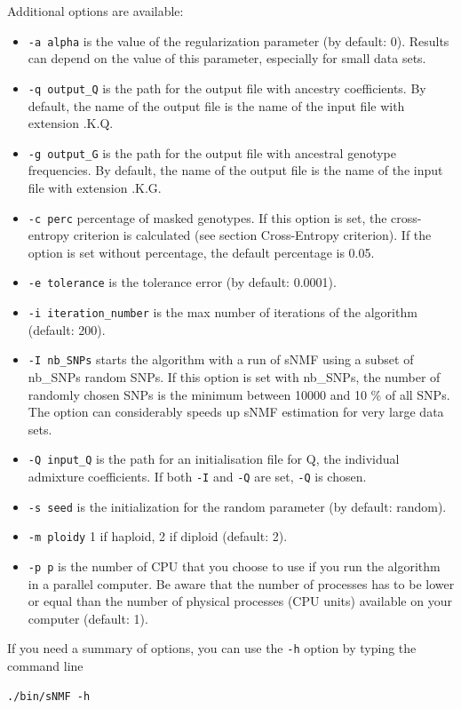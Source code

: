 \documentclass[10pt,a4paper]{article}
\begin{document}
\noindent
Additional options are available:
\begin{itemize}
\item \verb|-a alpha| is the value of the regularization parameter (by default: 0). Results can depend on the value of this parameter, especially for small data sets. 
\item \verb|-q output_Q| is the path for the output file with ancestry coefficients. By default, the name of the output file is the name of the input file with extension .K.Q.
\item \verb|-g output_G| is the path for the output file with ancestral genotype frequencies. By default, the name of the output file is the name of the input file with extension .K.G.
\item \verb|-c perc| percentage of masked genotypes. If this option is set, the cross-entropy criterion is calculated (see section Cross-Entropy criterion). If the option is set without percentage, the default percentage is 0.05.
\item \verb|-e tolerance| is the tolerance error (by default: 0.0001). 
\item \verb|-i iteration_number| is the max number of iterations of the algorithm (default: 200). 
\item \verb|-I nb_SNPs| starts the algorithm with a run of sNMF using a subset of nb\_SNPs random SNPs. If this option is set with nb\_SNPs, the number of randomly chosen SNPs is the minimum between 10000 and 10 \% of all SNPs. The option can considerably speeds up sNMF estimation for very large data sets.
\item \verb|-Q input_Q| is the path for an initialisation file for Q, the individual admixture coefficients. If both \verb|-I| and \verb|-Q| are set, \verb|-Q| is chosen.
\item \verb|-s seed| is the initialization for the random parameter (by default: random). 
\item \verb|-m ploidy|  1 if haploid, 2 if diploid (default: 2). 
\item \verb|-p p| is the number of CPU that you choose to use if you run the algorithm in 
a parallel computer. Be aware that the number of processes has to be lower or equal than the number 
of physical processes (CPU units) available on your computer (default: 1).
\end{itemize}


\noindent
If you need a summary of options, you can use the \verb|-h| option by typing the command line
\footnotesize
\begin{Verbatim}[frame=single]
./bin/sNMF -h
\end{Verbatim}
\noindent
\normalsize
\end{document}
